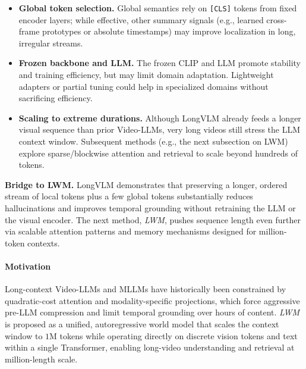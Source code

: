 \begin{enrichment}
\begin{enrichment}
\begin{itemize}
            \newpage
            
            \item \textbf{Global token selection.} Global semantics rely on \texttt{[CLS]} tokens from fixed encoder layers; while effective, other summary signals (e.g., learned cross-frame prototypes or absolute timestamps) may improve localization in long, irregular streams.
            \item \textbf{Frozen backbone and LLM.} The frozen CLIP and LLM promote stability and training efficiency, but may limit domain adaptation. Lightweight adapters or partial tuning could help in specialized domains without sacrificing efficiency.
            \item \textbf{Scaling to extreme durations.} Although LongVLM already feeds a longer visual sequence than prior Video-LLMs, very long videos still stress the LLM context window. Subsequent methods (e.g., the next subsection on LWM) explore sparse/blockwise attention and retrieval to scale beyond hundreds of tokens.
        \end{itemize}
        
        \medskip
        \noindent\textbf{Bridge to LWM.} LongVLM demonstrates that preserving a longer, ordered stream of local tokens plus a few global tokens substantially reduces hallucinations and improves temporal grounding without retraining the LLM or the visual encoder. The next method, \emph{LWM}, pushes sequence length even further via scalable attention patterns and memory mechanisms designed for million-token contexts.
        
    \end{enrichment}
    
    \newpage
    
    \begin{enrichment}
        \label{enr:subsec_chapter24_lwm}
        
        \paragraph{Motivation}
        Long-context Video-LLMs and MLLMs have historically been constrained by quadratic-cost attention and modality-specific projections, which force aggressive pre-LLM compression and limit temporal grounding over hours of content. \emph{LWM}~\cite{liu2025_lwm} is proposed as a unified, autoregressive world model that scales the context window to $1$M tokens while operating directly on discrete vision tokens and text within a single Transformer, enabling long-video understanding and retrieval at million-length scale. 
        

\end{enrichment}
\end{enrichment}
